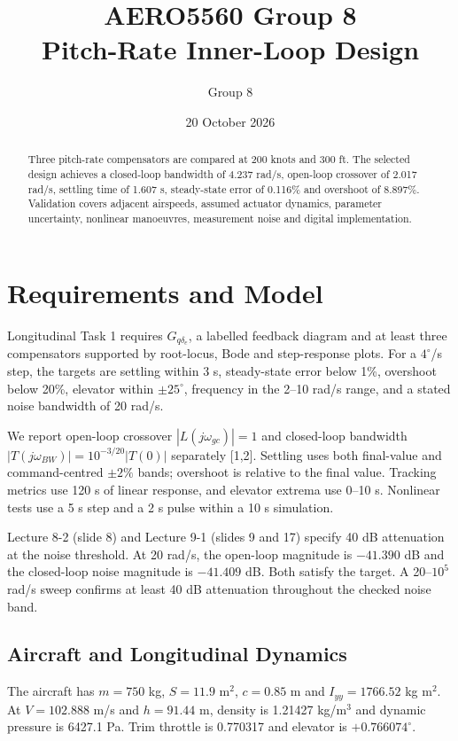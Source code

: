 \documentclass[a4paper,11pt]{article}
\title{AERO5560 Group 8\\Pitch-Rate Inner-Loop Design}
\author{Group 8}\date{20 October 2026}
\begin{document}
\maketitle
\begin{abstract}
Three pitch-rate compensators are compared at 200 knots and 300 ft. The selected design achieves a closed-loop bandwidth of 4.237 rad/s, open-loop crossover of 2.017 rad/s, settling time of 1.607 s, steady-state error of 0.116\% and overshoot of 8.897\%. Validation covers adjacent airspeeds, assumed actuator dynamics, parameter uncertainty, nonlinear manoeuvres, measurement noise and digital implementation.
\end{abstract}
\tableofcontents\clearpage
\section{Requirements and Model}
Longitudinal Task 1 requires $G_{q\delta_e}$, a labelled feedback diagram and at least three compensators supported by root-locus, Bode and step-response plots. For a $4^\circ$/s step, the targets are settling within 3 s, steady-state error below 1\%, overshoot below 20\%, elevator within $\pm25^\circ$, frequency in the 2--10 rad/s range, and a stated noise bandwidth of 20 rad/s.

We report open-loop crossover $|L(j\omega_{gc})|=1$ and closed-loop bandwidth $|T(j\omega_{BW})|=10^{-3/20}|T(0)|$ separately [1,2]. Settling uses both final-value and command-centred $\pm2\%$ bands; overshoot is relative to the final value. Tracking metrics use 120 s of linear response, and elevator extrema use 0--10 s. Nonlinear tests use a 5 s step and a 2 s pulse within a 10 s simulation.

Lecture 8-2 (slide 8) and Lecture 9-1 (slides 9 and 17) specify 40 dB attenuation at the noise threshold. At 20 rad/s, the open-loop magnitude is $-41.390$ dB and the closed-loop noise magnitude is $-41.409$ dB. Both satisfy the target. A 20--$10^5$ rad/s sweep confirms at least 40 dB attenuation throughout the checked noise band.

\subsection{Aircraft and Longitudinal Dynamics}
The aircraft has $m=750$ kg, $S=11.9$ m$^2$, $c=0.85$ m and $I_{yy}=1766.52$ kg m$^2$. At $V=102.888$ m/s and $h=91.44$ m, density is 1.21427 kg/m$^3$ and dynamic pressure is 6427.1 Pa. Trim throttle is 0.770317 and elevator is $+0.766074^\circ$.
\end{document}
